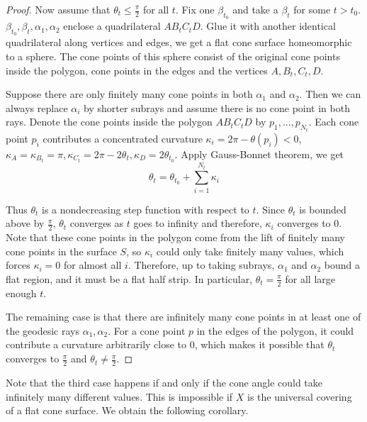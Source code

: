 \documentclass[reqno]{amsart}
\theoremstyle{plain}
\theoremstyle{definition}
\theoremstyle{remark}
\theoremstyle{definition}
\newcommand{\?}{\textcolor{red}{?}}
\begin{document}
\begin{proof}
Now assume that $\theta_t\le\frac{\pi}{2}$ for all $t$. Fix one $\beta_{t_0}$ and take a $\beta_t$ for some $t>t_0$. $\beta_{t_0},\beta_t,\alpha_1,\alpha_2$ enclose a quadrilateral $AB_tC_tD$. Glue it with another identical quadrilateral along vertices and edges, we get a flat cone surface homeomorphic to a sphere. The cone points of this sphere consist of the original cone points inside the polygon, cone points in the edges and the vertices $A,B_t,C_t,D$.

Suppose there are only finitely many cone points in both $\alpha_1$ and $\alpha_2$. Then we can always replace $\alpha_i$ by shorter subrays and assume there is no cone point in both rays. Denote the cone points inside the polygon $AB_tC_tD$ by $p_1,\ldots,p_{N_t}$. Each cone point $p_i$ contributes a concentrated curvature $\kappa_i=2\pi-\theta(p_i)<0$, $\kappa_A=\kappa_{B_t}=\pi, \kappa_{C_t}=2\pi-2\theta_t, \kappa_{D}=2\theta_{t_0}$. Apply Gauss-Bonnet theorem, we get
\[\theta_t=\theta_{t_0}+\sum_{i=1}^{N_t}\kappa_i\]

Thus $\theta_t$ is a nondecreasing step function with respect to $t$. Since $\theta_t$ is bounded above by $\frac{\pi}{2}$, $\theta_t$ converges as $t$ goes to infinity and therefore, $\kappa_i$ converges to $0$. Note that these cone points in the polygon come from the lift of finitely many cone points in the surface $S$, so $\kappa_i$ could only take finitely many values, which forces $\kappa_i=0$ for almost all $i$. Therefore, up to taking subrays, $\alpha_1$ and $\alpha_2$ bound a flat region, and it must be a flat half strip. In particular, $\theta_t=\frac{\pi}{2}$ for all large enough $t$. 

The remaining case is that there are infinitely many cone points in at least one of the geodesic rays $\alpha_1,\alpha_2$. For a cone point $p$ in the edges of the polygon, it could contribute a curvature arbitrarily close to 0, which makes it possible that $\theta_t$ converges to $\frac{\pi}{2}$ and $\theta_t\ne \frac{\pi}{2}$.
\end{proof}

Note that the third case happens if and only if the cone angle could take infinitely many different values. This is impossible if $X$ is the universal covering of a flat cone surface. We obtain the following corollary.
\end{document}
